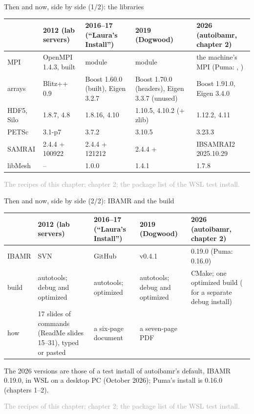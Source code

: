 \documentclass[aspectratio=169,11pt]{beamer}
\newcommand{\sourcecredit}[1]{\vfill\begin{flushright}\tiny\textcolor{DarkGray}{#1}\end{flushright}}
\begin{document}
\begin{frame}{Then and now, side by side (1/2): the libraries}
\label{fr:thennow}
\scriptsize
\renewcommand{\arraystretch}{1.06}
\setlength{\tabcolsep}{3pt}
\begin{tabular}{@{}L{0.11\textwidth}L{0.18\textwidth}L{0.2\textwidth}L{0.2\textwidth}L{0.23\textwidth}@{}}
\toprule
 & 2012 (lab servers) & 2016--17 (``Laura's Install'') & 2019 (Dogwood) & 2026 (autoibamr, chapter 2) \\
\midrule
MPI & OpenMPI 1.4.3, built & module  & module  & the machine's MPI (Puma: , ) \\
arrays & Blitz++ 0.9 & Boost 1.60.0 (built), Eigen 3.2.7 & Boost 1.70.0 (headers), Eigen 3.3.7 (unused) & Boost 1.91.0, Eigen 3.4.0 \\
HDF5, Silo & 1.8.7, 4.8 & 1.8.16, 4.10 & 1.10.5, 4.10.2 (+ zlib) & 1.12.2, 4.11 \\
PETSc & 3.1-p7 & 3.7.2 & 3.10.5 & 3.23.3 \\
SAMRAI & 2.4.4 + 100922 & 2.4.4 + 121212 & 2.4.4 +  & IBSAMRAI2 2025.10.29 \\
libMesh & -- & 1.0.0 & 1.4.1 & 1.7.8 \\
\bottomrule
\end{tabular}
\sourcecredit{The recipes of this chapter; chapter 2; the package list of the WSL test install.}
\end{frame}

\begin{frame}{Then and now, side by side (2/2): IBAMR and the build}
\label{fr:thennow2}
\scriptsize
\renewcommand{\arraystretch}{1.06}
\setlength{\tabcolsep}{3pt}
\begin{tabular}{@{}L{0.11\textwidth}L{0.18\textwidth}L{0.2\textwidth}L{0.2\textwidth}L{0.23\textwidth}@{}}
\toprule
 & 2012 (lab servers) & 2016--17 (``Laura's Install'') & 2019 (Dogwood) & 2026 (autoibamr, chapter 2) \\
\midrule
IBAMR & SVN  & GitHub  & v0.4.1 & 0.19.0 (Puma: 0.16.0) \\
build & autotools; debug and optimized & autotools; optimized & autotools; debug and optimized & CMake; one optimized build ( for a separate debug install) \\
how & 17 slides of commands (ReadMe slides 15--31), typed or pasted & a six-page document & a seven-page PDF &  \\
\bottomrule
\end{tabular}

\vspace{2mm}
\footnotesize The 2026 versions are those of a test install of autoibamr's default, IBAMR 0.19.0, in WSL on a desktop PC (October 2026); Puma's install is 0.16.0 (chapters 1--2).
\sourcecredit{The recipes of this chapter; chapter 2; the package list of the WSL test install.}
\end{frame}
\end{document}
